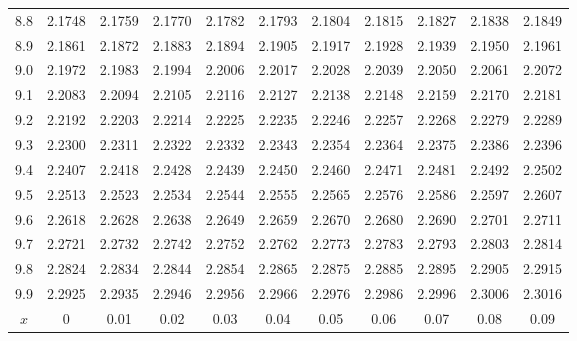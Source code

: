 {\begin{tabular}{|c|cccccccccc|}
8.8 & 2.1748 & 2.1759 & 2.1770 & 2.1782 & 2.1793 & 2.1804 & 2.1815 & 2.1827 & 2.1838 & 2.1849 \\
8.9 & 2.1861 & 2.1872 & 2.1883 & 2.1894 & 2.1905 & 2.1917 & 2.1928 & 2.1939 & 2.1950 & 2.1961 \\
\hline
9.0 & 2.1972 & 2.1983 & 2.1994 & 2.2006 & 2.2017 & 2.2028 & 2.2039 & 2.2050 & 2.2061 & 2.2072 \\
9.1 & 2.2083 & 2.2094 & 2.2105 & 2.2116 & 2.2127 & 2.2138 & 2.2148 & 2.2159 & 2.2170 & 2.2181 \\
9.2 & 2.2192 & 2.2203 & 2.2214 & 2.2225 & 2.2235 & 2.2246 & 2.2257 & 2.2268 & 2.2279 & 2.2289 \\
9.3 & 2.2300 & 2.2311 & 2.2322 & 2.2332 & 2.2343 & 2.2354 & 2.2364 & 2.2375 & 2.2386 & 2.2396 \\
9.4 & 2.2407 & 2.2418 & 2.2428 & 2.2439 & 2.2450 & 2.2460 & 2.2471 & 2.2481 & 2.2492 & 2.2502 \\
\hline
9.5 & 2.2513 & 2.2523 & 2.2534 & 2.2544 & 2.2555 & 2.2565 & 2.2576 & 2.2586 & 2.2597 & 2.2607 \\
9.6 & 2.2618 & 2.2628 & 2.2638 & 2.2649 & 2.2659 & 2.2670 & 2.2680 & 2.2690 & 2.2701 & 2.2711 \\
9.7 & 2.2721 & 2.2732 & 2.2742 & 2.2752 & 2.2762 & 2.2773 & 2.2783 & 2.2793 & 2.2803 & 2.2814 \\
9.8 & 2.2824 & 2.2834 & 2.2844 & 2.2854 & 2.2865 & 2.2875 & 2.2885 & 2.2895 & 2.2905 & 2.2915 \\
9.9 & 2.2925 & 2.2935 & 2.2946 & 2.2956 & 2.2966 & 2.2976 & 2.2986 & 2.2996 & 2.3006 & 2.3016 \\
\hline
$x$ & 0 & 0.01 & 0.02 & 0.03 & 0.04 & 0.05 & 0.06 & 0.07 & 0.08 & 0.09 \\ \hline
\end{tabular}\par}
